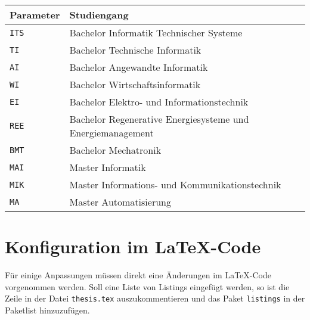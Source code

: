 \begin{center}
  \begin {tabular}{ll}
    Parameter & Studiengang \\
    \hline
    \texttt{ITS} & Bachelor Informatik Technischer Systeme \\
    \texttt{TI} & Bachelor Technische Informatik \\
    \texttt{AI} & Bachelor Angewandte Informatik \\
    \texttt{WI} & Bachelor Wirtschaftsinformatik \\
    \texttt{EI} & Bachelor Elektro- und Informationstechnik \\
    \texttt{REE} & Bachelor Regenerative Energiesysteme und Energiemanagement \\
    \texttt{BMT} & Bachelor Mechatronik \\
    \texttt{MAI} & Master Informatik \\
    \texttt{MIK} & Master Informations- und Kommunikationstechnik \\
    \texttt{MA} & Master Automatisierung \\
  \end{tabular}
\end{center}

\section{Konfiguration im \LaTeX -Code}\label{sec:codechanges}
Für einige Anpassungen müssen direkt eine Änderungen im \LaTeX -Code vorgenommen werden. Soll eine Liste von Listings eingefügt werden, so ist die Zeile in der Datei \texttt{thesis.tex} auszukommentieren und das Paket \texttt{listings} in der Paketlist hinzuzufügen.

